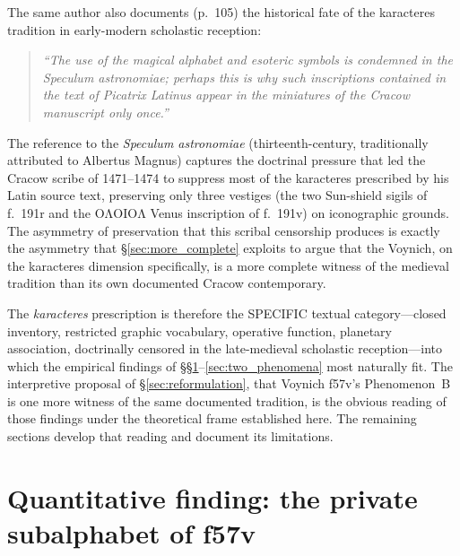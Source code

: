 \noindent The same author also documents (p.~105) the historical fate
of the karacteres tradition in early-modern scholastic reception:

\begin{quote}
\itshape
``The use of the magical alphabet and esoteric symbols is condemned
in the \textit{Speculum astronomiae}; perhaps this is why such
inscriptions contained in the text of \textit{Picatrix Latinus}
appear in the miniatures of the Cracow manuscript only once.''
\end{quote}

\noindent The reference to the \textit{Speculum astronomiae}
(thirteenth-century, traditionally attributed to Albertus Magnus)
captures the doctrinal pressure that led the Cracow scribe of
1471--1474 to suppress most of the karacteres prescribed by his Latin
source text, preserving only three vestiges (the two Sun-shield
sigils of f.~191r and the $\mathrm{O\Lambda OIO\Lambda}$ Venus
inscription of f.~191v) on iconographic grounds. The asymmetry of
preservation that this scribal censorship produces is exactly the
asymmetry that \S\ref{sec:more_complete} exploits to argue that the
Voynich, on the karacteres dimension specifically, is a more
complete witness of the medieval tradition than its own documented
Cracow contemporary.

The \textit{karacteres} prescription is therefore the SPECIFIC textual
category---closed inventory, restricted graphic vocabulary, operative
function, planetary association, doctrinally censored in the
late-medieval scholastic reception---into which the empirical findings
of \S\S\ref{sec:subalphabet}--\ref{sec:two_phenomena} most naturally
fit. The interpretive proposal of \S\ref{sec:reformulation}, that
Voynich f57v's Phenomenon~B is one more witness of the same
documented tradition, is the obvious reading of those findings under
the theoretical frame established here. The remaining sections develop
that reading and document its limitations.


\section{Quantitative finding: the private subalphabet of f57v}
\label{sec:subalphabet}

